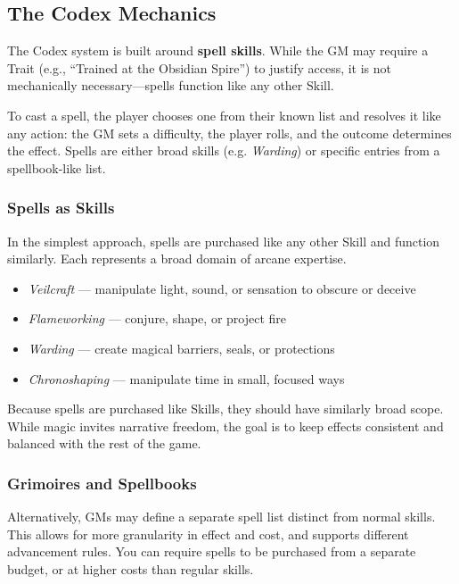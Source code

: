 \subsection{The Codex Mechanics}

The Codex system is built around \textbf{spell skills}. While the GM may require a Trait (e.g., “Trained at the Obsidian Spire”) to justify access, it is not mechanically necessary—spells function like any other Skill.

To cast a spell, the player chooses one from their known list and resolves it like any action: the GM sets a difficulty, the player rolls, and the outcome determines the effect. Spells are either broad skills (e.g. \textit{Warding}) or specific entries from a spellbook-like list.

\subsubsection{Spells as Skills}

In the simplest approach, spells are purchased like any other Skill and function similarly. Each represents a broad domain of arcane expertise.

\begin{Example}
    \begin{itemize}
        \item \textit{Veilcraft} — manipulate light, sound, or sensation to obscure or deceive  
        \item \textit{Flameworking} — conjure, shape, or project fire  
        \item \textit{Warding} — create magical barriers, seals, or protections  
        \item \textit{Chronoshaping} — manipulate time in small, focused ways  
    \end{itemize}
\end{Example}

Because spells are purchased like Skills, they should have similarly broad scope. While magic invites narrative freedom, the goal is to keep effects consistent and balanced with the rest of the game.

\subsubsection{Grimoires and Spellbooks}

Alternatively, GMs may define a separate spell list distinct from normal skills. This allows for more granularity in effect and cost, and supports different advancement rules. You can require spells to be purchased from a separate budget, or at higher costs than regular skills.

